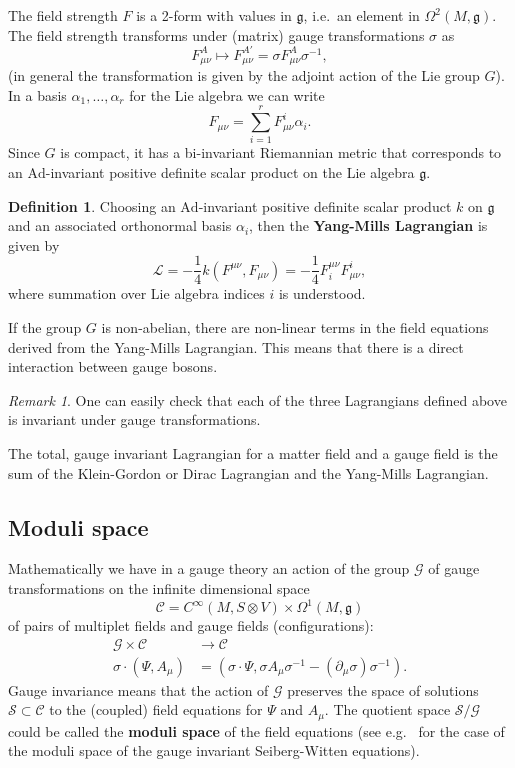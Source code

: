 \documentclass[12pt]{amsart}
\theoremstyle{definition}
\newtheorem{defn}[thm]{Definition}
\theoremstyle{remark}
\newtheorem{rem}[thm]{Remark}
\numberwithin{equation}{section}
\begin{document}
The field strength $F$ is a 2-form with values in $\mathfrak{g}$, i.e.~an element in $\Omega^2(M,\mathfrak{g})$. The field strength transforms under (matrix) gauge transformations $\sigma$ as 
\begin{equation*}
F^A_{\mu\nu}\longmapsto F^{A'}_{\mu\nu}=\sigma F^A_{\mu\nu}\sigma^{-1},
\end{equation*}
(in general the transformation is given by the adjoint action of the Lie group $G$). In a basis $\alpha_1,\ldots,\alpha_r$ for the Lie algebra we can write
\begin{equation*}
F_{\mu\nu}=\sum_{i=1}^rF_{\mu\nu}^i\alpha_i.
\end{equation*} 
Since $G$ is compact, it has a bi-invariant Riemannian metric that corresponds to an $\mathrm{Ad}$-invariant positive definite scalar product on the Lie algebra $\mathfrak{g}$. 
\begin{defn}\label{defn YM Lag}
Choosing an $\mathrm{Ad}$-invariant positive definite scalar product $k$ on $\mathfrak{g}$ and an associated orthonormal basis $\alpha_i$, then the {\bf Yang-Mills Lagrangian} is given by
\begin{equation*}
\mathcal{L}=-\frac{1}{4}k(F^{\mu\nu},F_{\mu\nu})=-\frac{1}{4}F^{\mu\nu}_iF_{\mu\nu}^i,
\end{equation*}
where summation over Lie algebra indices $i$ is understood.
\end{defn}
If the group $G$ is non-abelian, there are non-linear terms in the field equations derived from the Yang-Mills Lagrangian. This means that there is a direct interaction between gauge bosons. 
\begin{rem}
One can easily check that each of the three Lagrangians defined above is invariant under gauge transformations.
\end{rem}
The total, gauge invariant Lagrangian for a matter field and a gauge field is the sum of the Klein-Gordon or Dirac Lagrangian and the Yang-Mills Lagrangian.


\subsection{Moduli space}
Mathematically we have in a gauge theory an action of the group $\mathcal{G}$ of gauge transformations on the infinite dimensional space 
\begin{equation*}
\mathcal{C}=C^\infty(M,S\otimes V)\times\Omega^1(M,\mathfrak{g})
\end{equation*}
of pairs of multiplet fields and gauge fields (configurations):
\begin{align*}
\mathcal{G}\times\mathcal{C}&\longrightarrow\mathcal{C}\\
\sigma\cdot(\Psi,A_\mu)&=(\sigma\cdot\Psi,\sigma A_\mu \sigma^{-1}-(\partial_\mu\sigma)\sigma^{-1}).
\end{align*}
Gauge invariance means that the action of $\mathcal{G}$ preserves the space of solutions $\mathcal{S}\subset\mathcal{C}$ to the (coupled) field equations for $\Psi$ and $A_\mu$. The quotient space $\mathcal{S}/\mathcal{G}$ could be called the {\bf moduli space} of the field equations (see e.g.~\cite{Morgan} for the case of the moduli space of the gauge invariant Seiberg-Witten equations). 
\end{document}
